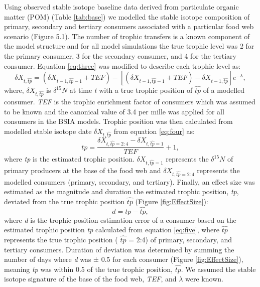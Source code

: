 \documentclass [11pt, proquest] {uwthesis}[2015/03/03]
\begin{document}
Using observed stable isotope baseline data derived from particulate
organic matter (POM) (Table \ref{tab:base}) we modelled the stable
isotope composition of primary, secondary and tertiary consumers
associated with a particular food web scenario (Figure 5.1). The number
of trophic transfers is a known component of the model structure and for
all model simulations the true trophic level was 2 for the primary
consumer, 3 for the secondary consumer, and 4 for the tertiary consumer.
Equation \eqref{eq:three} was modified to describe each trophic level as:
\begin{equation} 
  \delta X_{t,\hat{tp}} = 
  (\delta X_{t-1,\widehat{tp}-1} + TEF) - 
  [(\delta X_{t-1,\widehat{tp}-1} + TEF) -
  \delta X_{t-1,\widehat{tp}}]e^{- \lambda},
  \label{eq:four}
\end{equation}
where, \(\delta X_{t,\widehat{tp}}\) is \(\delta^{15}N\) at time
\emph{t} with a true trophic position of \(\widehat{tp}\) of a modelled
consumer. \emph{TEF} is the trophic enrichment factor of consumers which
was assumed to be known and the canonical value of 3.4 per mille was
applied for all consumers in the BSIA models. Trophic position was then
calculated from modelled stable isotope date
\(\delta X_{t,\widehat{tp}}\) from equation \eqref{eq:four} as:
\begin{equation} 
  tp = \frac{\delta X_{t, \widehat{tp} = 2:4}-\delta X_{t,\widehat{tp} = 1}}
  {TEF} + 1,
  \label{eq:five}
\end{equation}
where \emph{tp} is the estimated trophic position.
\(\delta X_{t,\widehat{tp}=1}\) represents the \(\delta^{15}N\) of
primary producers at the base of the food web and
\(\delta X_{t,\widehat{tp}=2:4}\) represents the modelled consumers
(primary, secondary, and tertiary). Finally, an effect size was
estimated as the magnitude and duration the estimated trophic position,
\emph{tp}, deviated from the true trophic position \(\widehat{tp}\)
(Figure \ref{fig:EffectSize}):
\begin{equation} 
  d = tp - \widehat{tp},
  \label{eq:six}
\end{equation}
where \emph{d} is the trophic position estimation error of a consumer
based on the estimated trophic position \emph{tp} calculated from
equation \eqref{eq:five}, where \(\widehat{tp}\) represents the true
trophic position ( \(\widehat{tp}\) = 2:4) of primary, secondary, and
tertiary consumers. Duration of deviation was determined by summing the
number of days where \emph{d} was ± 0.5 for each consumer (Figure
\ref{fig:EffectSize}), meaning \emph{tp} was within 0.5 of the true
trophic position, \(\widehat{tp}\). We assumed the stable isotope
signature of the base of the food web, \emph{TEF}, and \(\lambda\) were
known.
\end{document}
